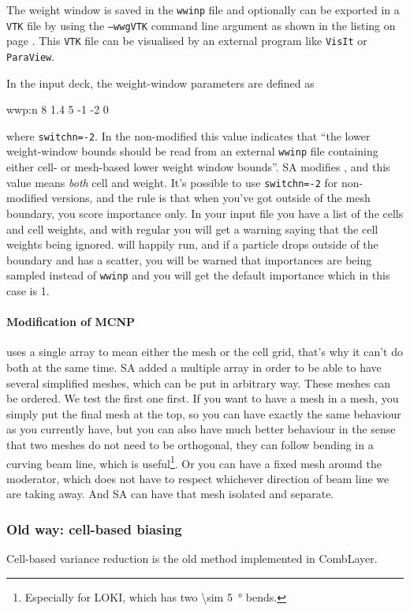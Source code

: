 The weight window is saved in the {\tt wwinp} file and optionally can be exported in a {\tt VTK} file by using the {\tt --wwgVTK} command line argument
as shown in the listing on page \pageref{bash:vr:cadis:mesh:run}.
This {\tt VTK} file can be visualised by an external program like {\tt VisIt} or {\tt ParaView}.

In the input deck, the weight-window parameters are defined as
\begin{deck}
 wwp:n 8 1.4 5 -1 -2 0
\end{deck}
where {\tt switchn=-2}. In the non-modified \mcnp this value indicates that ``the lower weight-window bounds should be read from an external {\tt wwinp} file
containing either cell- or mesh-based lower weight window bounds''.
SA modifies \mcnp, and this value means {\em both} cell and weight.
It's possible to use {\tt switchn=-2} for non-modified \mcnp versions, and the rule is that when you've got outside of the mesh boundary, you score
importance only. In your input file you have a list of the cells and cell weights, and with regular \mcnp you will get a warning saying that the cell weights being ignored.
\mcnp will happily run, and if a particle drops outside of the boundary and has a scatter, you will be warned that importances are being sampled instead of {\tt wwinp} 
and you will get the default importance which in this case is 1.

\paragraph{Modification of MCNP}
\mcnp uses a single array to mean either the mesh or the cell grid, that's why it can't do both at the same time.
SA added a multiple array in order to be able to have several simplified meshes, which can be put in arbitrary way.
These meshes can be ordered.
We test the first one first. If you want to have a mesh in a mesh, you simply put the final mesh at the top,
so you can have exactly the same behaviour as you currently have, but you can also have much better behaviour in the sense
that two meshes do not need to be orthogonal, they can follow bending in a curving beam line, which is useful\footnote{Especially for LOKI, which has two \SI{\sim 5}{\degree} bends.}.
Or you can have a fixed mesh around the moderator, which does not have to respect whichever direction of beam line we are taking away.
And SA can have that mesh isolated and separate.

\subsubsection{Old way: cell-based biasing}
\label{sec:vr:cadis:cell}
Cell-based variance reduction is the old method implemented in CombLayer.

